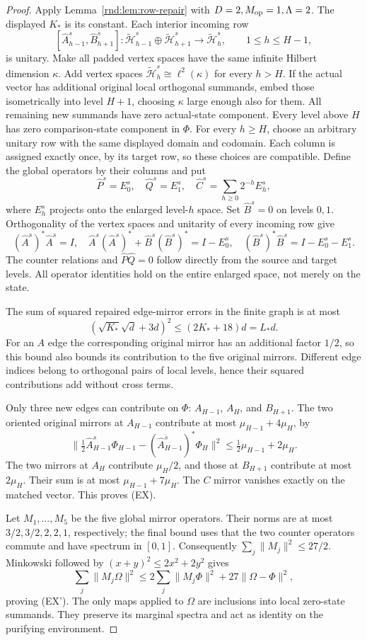 \begin{proof}
Apply Lemma~\ref{rnd:lem:row-repair} with $D=2,M_{\rm op}=1,\Lambda=2$. The displayed $K_*$ is its constant. Each interior incoming row
\[
 [\widehat A_{h-1}^s,\widehat B_{h+1}^s]:
 \widetilde{\mathcal H}_{h-1}^s\oplus\widetilde{\mathcal H}_{h+1}^s
 \longrightarrow\widetilde{\mathcal H}_h^s,
 \qquad 1\le h\le H-1,
\]
is unitary. Make all padded vertex spaces have the same infinite Hilbert dimension $\kappa$. Add vertex spaces $\widetilde{\mathcal H}_h^s\cong\ell^2(\kappa)$ for every $h>H$. If the actual vector has additional original local orthogonal summands, embed those isometrically into level $H+1$, choosing $\kappa$ large enough also for them. All remaining new summands have zero actual-state component. Every level above $H$ has zero comparison-state component in $\Phi$. For every $h\ge H$, choose an arbitrary unitary row with the same displayed domain and codomain. Each column is assigned exactly once, by its target row, so these choices are compatible. Define the global operators by their columns and put
\[
 \widehat P^s=E_0^s,\quad \widehat Q^s=E_1^s,\quad
 \widehat C^s=\sum_{h\ge0}2^{-h}E_h^s,
\]
where $E_h^s$ projects onto the enlarged level-$h$ space. Set $\widehat B^s=0$ on levels $0,1$. Orthogonality of the vertex spaces and unitarity of every incoming row give
\[
 (\widehat A^s)^*\widehat A^s=I,\quad
 \widehat A^s(\widehat A^s)^*+\widehat B^s(\widehat B^s)^*=I-E_0^s,
 \quad (\widehat B^s)^*\widehat B^s=I-E_0^s-E_1^s.
\]
The counter relations and $\widehat P\widehat Q=0$ follow directly from the source and target levels. All operator identities hold on the entire enlarged space, not merely on the state.

The sum of squared repaired edge-mirror errors in the finite graph is at most
\[
 (\sqrt{K_*}\sqrt d+3d)^2\le(2K_*+18)d=L_*d.
\]
For an $A$ edge the corresponding original mirror has an additional factor $1/2$, so this bound also bounds its contribution to the five original mirrors. Different edge indices belong to orthogonal pairs of local levels, hence their squared contributions add without cross terms.

Only three new edges can contribute on $\Phi$: $A_{H-1}$, $A_H$, and $B_{H+1}$. The two oriented original mirrors at $A_{H-1}$ contribute at most $\mu_{H-1}+4\mu_H$, by
\[
 \|\tfrac12\widehat A_{H-1}^s\Phi_{H-1}-(\widehat A_{H-1}^{\bar s})^*\Phi_H\|^2
 \le\tfrac12\mu_{H-1}+2\mu_H.
\]
The two mirrors at $A_H$ contribute $\mu_H/2$, and those at $B_{H+1}$ contribute at most $2\mu_H$. Their sum is at most $\mu_{H-1}+7\mu_H$. The $C$ mirror vanishes exactly on the matched vector. This proves (EX).

Let $M_1,\ldots,M_5$ be the five global mirror operators. Their norms are at most $3/2,3/2,2,2,1$, respectively; the final bound uses that the two counter operators commute and have spectrum in $[0,1]$. Consequently $\sum_j\|M_j\|^2\le27/2$. Minkowski followed by $(x+y)^2\le2x^2+2y^2$ gives
\[
 \sum_j\|M_j\Omega\|^2
 \le2\sum_j\|M_j\Phi\|^2+27\|\Omega-\Phi\|^2,
\]
proving (EX'). The only maps applied to $\Omega$ are inclusions into local zero-state summands. They preserve its marginal spectra and act as identity on the purifying environment.
\end{proof}

